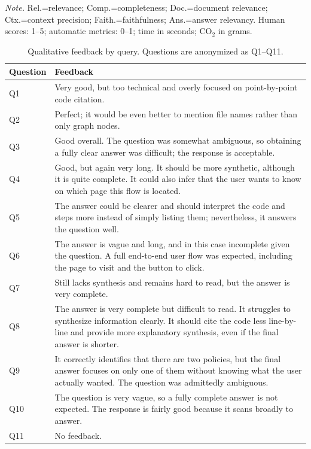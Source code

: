 \documentclass[sigconf]{acmart}
\begin{document}
\begin{table}[!t]
\vspace{-0.5em}
\begin{flushleft}
\tiny
\textit{Note.} Rel.=relevance; Comp.=completeness; Doc.=document relevance; Ctx.=context precision; Faith.=faithfulness; Ans.=answer relevancy. Human scores: 1--5; automatic metrics: 0--1; time in seconds; CO$_2$ in grams.
\end{flushleft}
\vspace{-1em}
\end{table}

\begin{table}[!t]
\centering
\caption{\small Qualitative feedback by query. Questions are anonymized as Q1--Q11.}
\label{tab:qualitative_feedback}
\tiny
\setlength{\tabcolsep}{12pt}
\renewcommand{\arraystretch}{0.80}
\begin{tabularx}{\textwidth}{@{}lX@{}}
\toprule
\textbf{Question} & \textbf{Feedback} \\
\midrule
Q1 & Very good, but too technical and overly focused on point-by-point code citation. \\
Q2 & Perfect; it would be even better to mention file names rather than only graph nodes. \\
Q3 & Good overall. The question was somewhat ambiguous, so obtaining a fully clear answer was difficult; the response is acceptable. \\
Q4 & Good, but again very long. It should be more synthetic, although it is quite complete. It could also infer that the user wants to know on which page this flow is located. \\
Q5 & The answer could be clearer and should interpret the code and steps more instead of simply listing them; nevertheless, it answers the question well. \\
Q6 & The answer is vague and long, and in this case incomplete given the question. A full end-to-end user flow was expected, including the page to visit and the button to click. \\
Q7 & Still lacks synthesis and remains hard to read, but the answer is very complete. \\
Q8 & The answer is very complete but difficult to read. It struggles to synthesize information clearly. It should cite the code less line-by-line and provide more explanatory synthesis, even if the final answer is shorter. \\
Q9 & It correctly identifies that there are two policies, but the final answer focuses on only one of them without knowing what the user actually wanted. The question was admittedly ambiguous. \\
Q10 & The question is very vague, so a fully complete answer is not expected. The response is fairly good because it scans broadly to answer. \\
Q11 & No feedback. \\
\bottomrule
\end{tabularx}

\vspace{-0.5em}
\begin{flushleft}
\tiny

\end{flushleft}
\vspace{-1em}
\end{table}
\end{document}
